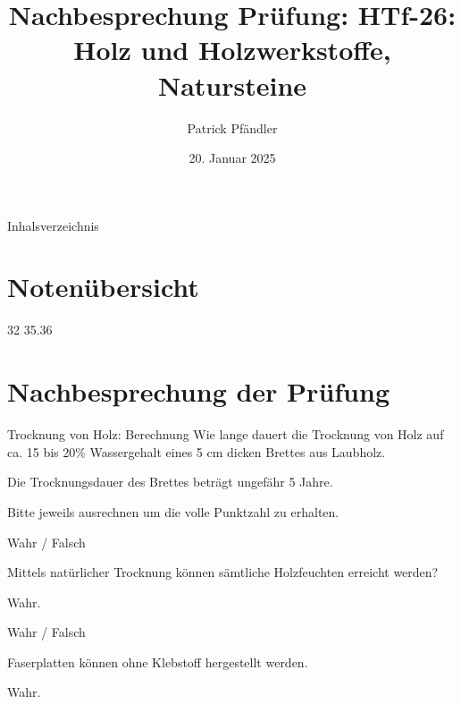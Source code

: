 \def\customoptions{aspectratio=169} %

\usepackage{fontawesome}  %


\title{\textbf{Nachbesprechung Prüfung: HTf-26: Holz und Holzwerkstoffe, Natursteine 
}}
\author{Patrick Pfändler}
\date{20. Januar 2025}



\frame{\titlepage}

\begin{frame}{Inhalsverzeichnis}
    \tableofcontents
\end{frame}

\section{Notenübersicht}
\BlueSectionSlide

{
    32%
}
{
    35.36%
}


\section{Nachbesprechung der Prüfung}
\BlueSectionSlide

\begin{frame}{Trocknung von Holz: Berechnung}
Wie lange dauert die Trocknung von Holz auf ca. 15 bis 20\% Wassergehalt eines 5 cm dicken Brettes aus Laubholz.
\pause
\begin{myLösung}
Die Trocknungsdauer des Brettes beträgt ungefähr 5 Jahre.
\end{myLösung}

Bitte jeweils ausrechnen um die volle Punktzahl zu erhalten.

\end{frame}

\begin{frame}{Wahr / Falsch}

\begin{Fragenblock}
    Mittels natürlicher Trocknung können sämtliche Holzfeuchten erreicht werden?
\end{Fragenblock}
\pause

\begin{myLösung}
Wahr.
\end{myLösung}

\end{frame}
\begin{frame}{Wahr / Falsch}

\begin{Fragenblock}
    Faserplatten können ohne Klebstoff hergestellt werden.
\end{Fragenblock}
\pause

\begin{myLösung}
Wahr.
\end{myLösung}
\end{frame}

